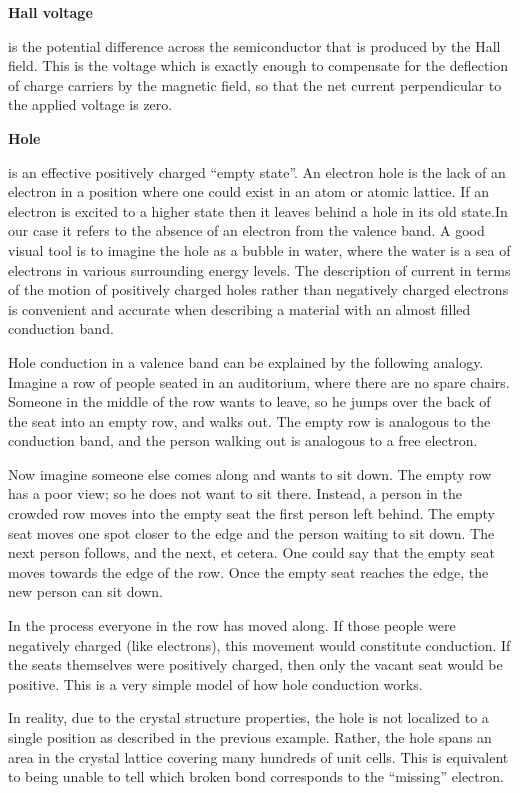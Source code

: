 \documentclass{../lab}
\begin{document}
\textbf{Hall voltage}

is the potential difference across the semiconductor that is produced by the Hall field. This is the voltage which is exactly enough to compensate for the deflection of charge carriers by the magnetic field, so that the net current perpendicular to the applied voltage is zero.

\textbf{Hole}

is an effective positively charged ``empty state''. An electron hole is the lack of an electron in a position where one could exist in an atom or atomic lattice. If an electron is excited to a higher state then it leaves behind a hole in its old state.In our case it refers to the absence of an electron from the valence band. A good visual tool is to imagine the hole as a bubble in water, where the water is a sea of electrons in various surrounding energy levels. The description of current in terms of the motion of positively charged holes rather than negatively charged electrons is convenient and accurate when describing a material with an almost filled conduction band.

Hole conduction in a valence band can be explained by the following analogy. Imagine a row of people seated in an auditorium, where there are no spare chairs. Someone in the middle of the row wants to leave, so he jumps over the back of the seat into an empty row, and walks out. The empty row is analogous to the conduction band, and the person walking out is analogous to a free electron.

Now imagine someone else comes along and wants to sit down. The empty row has a poor view; so he does not want to sit there. Instead, a person in the crowded row moves into the empty seat the first person left behind. The empty seat moves one spot closer to the edge and the person waiting to sit down. The next person follows, and the next, et cetera. One could say that the empty seat moves towards the edge of the row. Once the empty seat reaches the edge, the new person can sit down.

In the process everyone in the row has moved along. If those people were negatively charged (like electrons), this movement would constitute conduction. If the seats themselves were positively charged, then only the vacant seat would be positive. This is a very simple model of how hole conduction works.

In reality, due to the crystal structure properties, the hole is not localized to a single position as described in the previous example. Rather, the hole spans an area in the crystal lattice covering many hundreds of unit cells. This is equivalent to being unable to tell which broken bond corresponds to the ``missing'' electron.
\end{document}
